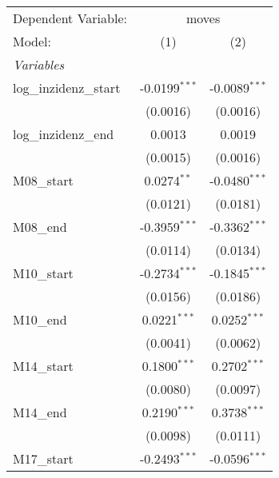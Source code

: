 \documentclass[10pt,a4paper]{article}
\author{Peer Lasse Hinrichsen}
\begin{document}
\begingroup
\centering
\begin{tabular}{lcc}
   \tabularnewline \midrule \midrule
   Dependent Variable: & \multicolumn{2}{c}{moves}\\
   Model:                                           & (1)             & (2)\\  
   \midrule
   \emph{Variables}\\
   log\_inzidenz\_start                             & -0.0199$^{***}$ & -0.0089$^{***}$\\   
                                                    & (0.0016)        & (0.0016)\\   
   log\_inzidenz\_end                               & 0.0013          & 0.0019\\   
                                                    & (0.0015)        & (0.0016)\\   
   M08\_start                                       & 0.0274$^{**}$   & -0.0480$^{***}$\\   
                                                    & (0.0121)        & (0.0181)\\   
   M08\_end                                         & -0.3959$^{***}$ & -0.3362$^{***}$\\   
                                                    & (0.0114)        & (0.0134)\\   
   M10\_start                                       & -0.2734$^{***}$ & -0.1845$^{***}$\\   
                                                    & (0.0156)        & (0.0186)\\   
   M10\_end                                         & 0.0221$^{***}$  & 0.0252$^{***}$\\   
                                                    & (0.0041)        & (0.0062)\\   
   M14\_start                                       & 0.1800$^{***}$  & 0.2702$^{***}$\\   
                                                    & (0.0080)        & (0.0097)\\   
   M14\_end                                         & 0.2190$^{***}$  & 0.3738$^{***}$\\   
                                                    & (0.0098)        & (0.0111)\\   
   M17\_start                                       & -0.2493$^{***}$ & -0.0596$^{***}$\\   

\end{tabular}
\end{document}
